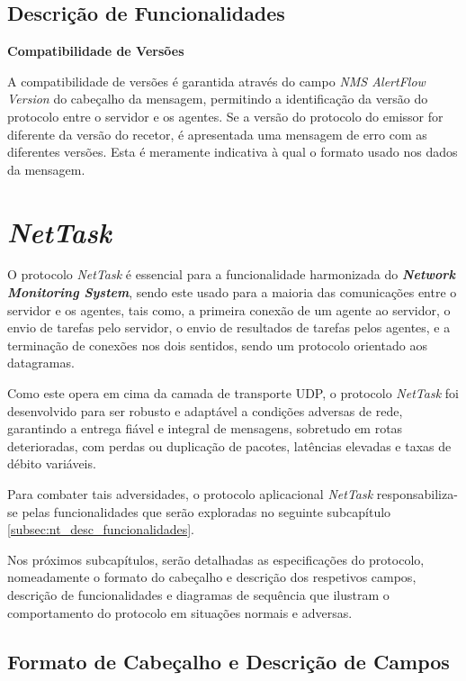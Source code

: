 \documentclass[a4paper,12pt]{scrreprt}
\begin{document}
\subsection{Descrição de Funcionalidades}

\textbf{Compatibilidade de Versões}

A compatibilidade de versões é garantida através do campo \textit{NMS AlertFlow Version}
do cabeçalho da mensagem, permitindo a identificação da versão do protocolo entre o
servidor e os agentes. Se a versão do protocolo do emissor for diferente da versão do
recetor, é apresentada uma mensagem de erro com as diferentes versões. Esta é meramente
indicativa à qual o formato usado nos dados da mensagem.

\clearpage

\section{\textit{NetTask}}

O protocolo \textit{NetTask} é essencial para a funcionalidade harmonizada do
\textbf{\textit{Network Monitoring System}}, sendo este usado para a maioria
das comunicações entre o servidor e os agentes, tais como, a primeira conexão de
um agente ao servidor, o envio de tarefas pelo servidor, o envio de resultados
de tarefas pelos agentes, e a terminação de conexões nos dois sentidos, sendo
um protocolo orientado aos datagramas.

Como este opera em cima da camada de transporte UDP, o protocolo \textit{NetTask}
foi desenvolvido para ser robusto e adaptável a condições adversas de rede,
garantindo a entrega fiável e integral de mensagens, sobretudo em rotas deterioradas,
com perdas ou duplicação de pacotes, latências elevadas e taxas de débito variáveis.

Para combater tais adversidades, o protocolo aplicacional \textit{NetTask}
responsabiliza-se pelas funcionalidades que serão exploradas no seguinte
subcapítulo \ref{subsec:nt_desc_funcionalidades}.

Nos próximos subcapítulos, serão detalhadas as especificações do protocolo,
nomeadamente o formato do cabeçalho e descrição dos respetivos campos,
descrição de funcionalidades e diagramas de sequência que ilustram o
comportamento do protocolo em situações normais e adversas.

\subsection{Formato de Cabeçalho e Descrição de Campos}
\end{document}
